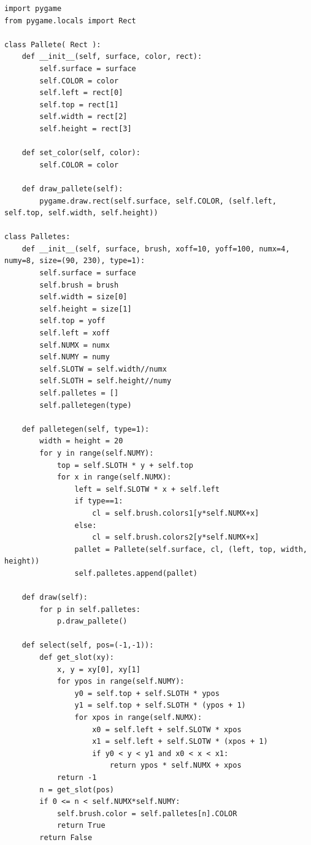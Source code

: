 \documentclass[uplatex,a4paper,11pt,oneside,openany]{jsbook}
\begin{document}
\begin{lstlisting}[caption=class Palletes,label=pr07]
import pygame
from pygame.locals import Rect

class Pallete( Rect ):
    def __init__(self, surface, color, rect):
        self.surface = surface
        self.COLOR = color
        self.left = rect[0]
        self.top = rect[1]
        self.width = rect[2]
        self.height = rect[3]

    def set_color(self, color):
        self.COLOR = color

    def draw_pallete(self):
        pygame.draw.rect(self.surface, self.COLOR, (self.left, self.top, self.width, self.height))

class Palletes:
    def __init__(self, surface, brush, xoff=10, yoff=100, numx=4, numy=8, size=(90, 230), type=1):
        self.surface = surface
        self.brush = brush
        self.width = size[0]
        self.height = size[1]
        self.top = yoff
        self.left = xoff
        self.NUMX = numx
        self.NUMY = numy
        self.SLOTW = self.width//numx
        self.SLOTH = self.height//numy
        self.palletes = []
        self.palletegen(type)

    def palletegen(self, type=1):
        width = height = 20
        for y in range(self.NUMY):
            top = self.SLOTH * y + self.top
            for x in range(self.NUMX):
                left = self.SLOTW * x + self.left
                if type==1:
                    cl = self.brush.colors1[y*self.NUMX+x]
                else:
                    cl = self.brush.colors2[y*self.NUMX+x]
                pallet = Pallete(self.surface, cl, (left, top, width, height))
                self.palletes.append(pallet)

    def draw(self):
        for p in self.palletes:
            p.draw_pallete()

    def select(self, pos=(-1,-1)):
        def get_slot(xy):
            x, y = xy[0], xy[1]
            for ypos in range(self.NUMY):
                y0 = self.top + self.SLOTH * ypos
                y1 = self.top + self.SLOTH * (ypos + 1)
                for xpos in range(self.NUMX):
                    x0 = self.left + self.SLOTW * xpos
                    x1 = self.left + self.SLOTW * (xpos + 1)
                    if y0 < y < y1 and x0 < x < x1:
                        return ypos * self.NUMX + xpos
            return -1
        n = get_slot(pos)
        if 0 <= n < self.NUMX*self.NUMY:
            self.brush.color = self.palletes[n].COLOR
            return True
        return False
\end{lstlisting}
\end{document}
